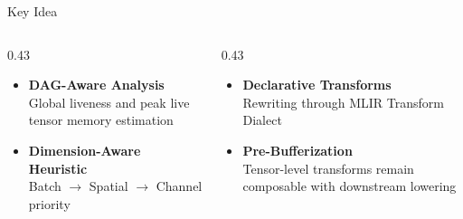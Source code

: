 \documentclass[10pt,aspectratio=169]{beamer}
\begin{document}
\begin{frame}{Key Idea}
\begin{columns}[T,totalwidth=0.9\textwidth]
\begin{column}{0.43\textwidth}
\begin{itemize}
\item \textbf{DAG-Aware Analysis}\\
Global liveness and peak live tensor memory estimation
\item \textbf{Dimension-Aware Heuristic}\\
Batch $\to$ Spatial $\to$ Channel priority
\end{itemize}
\end{column}
\begin{column}{0.43\textwidth}
\begin{itemize}
\item \textbf{Declarative Transforms}\\
Rewriting through MLIR Transform Dialect
\item \textbf{Pre-Bufferization}\\
Tensor-level transforms remain composable with downstream lowering
\end{itemize}
\end{column}
\end{columns}
\end{frame}

\end{document}
